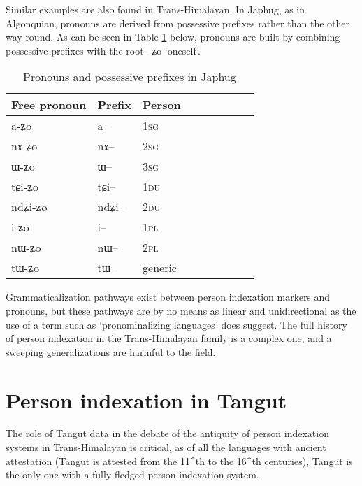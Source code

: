 \documentclass[oldfontcommands,oneside,a4paper,11pt]{article}
\newcommand{\ipa}[1]{{\phon \mbox{#1}}} %
\begin{document}
Similar examples are also found in Trans-Himalayan. In Japhug, as in Algonquian, pronouns are derived from possessive prefixes rather than the other way round. As can be seen in Table \ref{tab:pronoun} below, pronouns are built by combining possessive prefixes with the root \ipa{--ʑo} `oneself'. 

 \begin{table}[H] \centering
\caption{Pronouns and possessive prefixes in Japhug}\label{tab:pronoun}
\begin{tabular}{lllllllll} 
\toprule
 Free pronoun & Prefix & Person\\
\midrule
 \ipa{a-ʑo}  &	\ipa{a--}  &		1\textsc{sg} \\
\ipa{nɤ-ʑo}  &	\ipa{nɤ--}  &			2\textsc{sg}\\
\ipa{ɯ-ʑo}  &	\ipa{ɯ--}  &			3\textsc{sg}\\
\midrule
\ipa{tɕi-ʑo}  &	\ipa{tɕi--}  &			1\textsc{du} \\
\ipa{ndʑi-ʑo}  &	\ipa{ndʑi--}  &		2\textsc{du} \\	
\midrule
\ipa{i-ʑo}    &	\ipa{i--}  &			1\textsc{pl} \\
\ipa{nɯ-ʑo}   &	\ipa{nɯ--}  &			2\textsc{pl} \\
\midrule
\ipa{tɯ-ʑo} & \ipa{tɯ--}   &  generic\\
\bottomrule
\end{tabular}
\end{table}

 Grammaticalization pathways exist between person indexation markers and pronouns, but these pathways are by no means as linear and unidirectional as the use of a term such as `pronominalizing languages' does suggest. The full history of person indexation in the Trans-Himalayan family is a complex one, and a sweeping generalizations are harmful to the field.

\section{Person indexation in Tangut}
The role of Tangut data in the debate of the antiquity of person indexation systems in Trans-Himalayan is critical, as of all the languages with ancient attestation (Tangut is attested from the 11^{th} to the 16^{th} centuries), Tangut is the only one with a fully fledged person indexation system.


\end{document}
